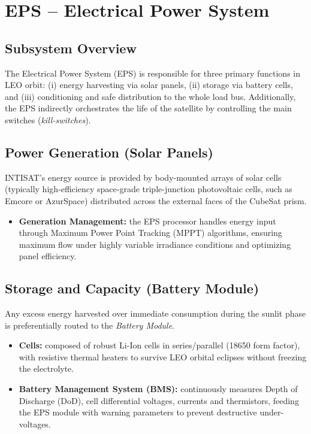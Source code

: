 \chapter{EPS – Electrical Power System}

\section{Subsystem Overview}
The Electrical Power System (EPS) is responsible for three primary functions in LEO orbit: (i) energy harvesting via solar panels, (ii) storage via battery cells, and (iii) conditioning and safe distribution to the whole load bus. Additionally, the EPS indirectly orchestrates the life of the satellite by controlling the main switches (\textit{kill-switches}).

\section{Power Generation (Solar Panels)}
INTISAT's energy source is provided by body-mounted arrays of solar cells (typically high-efficiency space-grade triple-junction photovoltaic cells, such as Emcore or AzurSpace) distributed across the external faces of the CubeSat prism.
\begin{itemize}
    \item \textbf{Generation Management:} the EPS processor handles energy input through Maximum Power Point Tracking (MPPT) algorithms, ensuring maximum flow under highly variable irradiance conditions and optimizing panel efficiency.
\end{itemize}

\section{Storage and Capacity (Battery Module)}
Any excess energy harvested over immediate consumption during the sunlit phase is preferentially routed to the \textit{Battery Module}.
\begin{itemize}
    \item \textbf{Cells:} composed of robust Li-Ion cells in series/parallel (18650 form factor), with resistive thermal heaters to survive LEO orbital eclipses without freezing the electrolyte.
    \item \textbf{Battery Management System (BMS):} continuously measures Depth of Discharge (DoD), cell differential voltages, currents and thermistors, feeding the EPS module with warning parameters to prevent destructive under-voltages.
\end{itemize}

